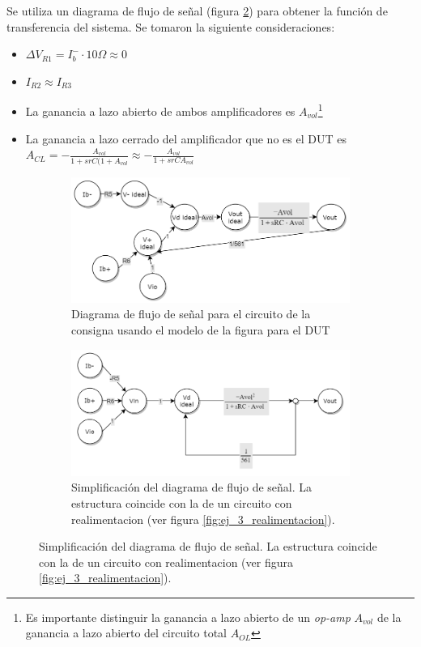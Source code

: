 \documentclass[../../main.tex]{subfiles}
\begin{document}
Se utiliza un diagrama de flujo de se\~nal (figura \ref{fig:ej_3_signal_flow_consigna_simplificado}) para obtener la funci\'on de transferencia del sistema. Se tomaron la siguiente consideraciones:
\begin{itemize}
	\item $\Delta V_{R1} = I_b^- \cdot 10\Omega \approx 0$
	\item $I_{R2}\approx I_{R3}$
	\item La ganancia a lazo abierto de ambos amplificadores es $A_{vol}$\footnote{Es importante distinguir la ganancia a lazo abierto de un \textit{op-amp} $A_{vol}$ de la ganancia a lazo abierto del circuito total $A_{OL}$ }
	\item La ganancia a lazo cerrado del amplificador que no es el DUT es $A_{CL} = -\frac{A_{vol}}{1+srC(1+A_{vol}} \approx -\frac{A_{vol}}{1+srCA_{vol}}$
\end{itemize}


\begin{figure}[htpb]%
	\centering
	\begin{subfigure}[t]{0.49\textwidth}
		\centering
		\includegraphics[width=\textwidth]{imagenes/signal_flow_consigna.png}
		\caption{Diagrama de flujo de se\~nal para el circuito de la consigna usando el modelo de la figura para el DUT}
		\label{fig:ej_3_signal_flow_consigna_no_simplificado}
	\end{subfigure}%
	\hfill%
	\begin{subfigure}[t]{0.49\textwidth}
		\centering
		\includegraphics[width=\textwidth]{imagenes/signal_flow_consigna_simplificado.png}
		\caption{Simplificaci\'on del diagrama de flujo de se\~nal. La estructura coincide con la de un circuito con realimentacion (ver figura \ref{fig:ej_3_realimentacion}). }
		\label{fig:ej_3_signal_flow_consigna_simplificado}
	\end{subfigure}
	\label{fig:ej_3_signal_flow_consigna}	
\end{figure}
\end{document}

